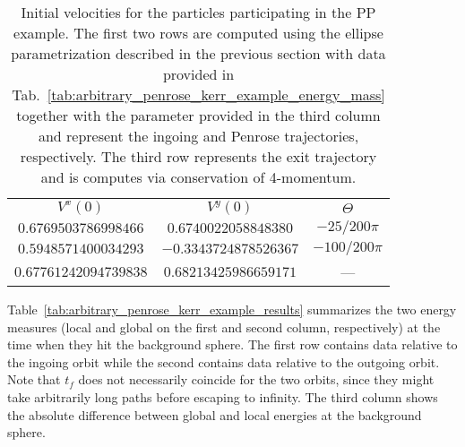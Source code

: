 \begin{table}[]
  \centering
  \begin{tabular}{ccc}
    \hline\hline
    $V^x(0)$              & $V^y(0)$              & $\Theta$       \\
    $0.6769503786998466$  & $0.6740022058848380$  & $-25/200 \pi$  \\
    $0.5948571400034293$  & $-0.3343724878526367$ & $-100/200 \pi$ \\
    $0.67761242094739838$ & $0.68213425986659171$ & ---            \\ \hline\hline
  \end{tabular}
  \caption{Initial velocities for the particles participating in the PP example. The first two rows are computed using the ellipse parametrization described in the previous section with data provided in Tab.~\ref{tab:arbitrary_penrose_kerr_example_energy_mass} together with the parameter provided in the third column and represent the ingoing and Penrose trajectories, respectively. The third row represents the exit trajectory and is computes via conservation of 4-momentum.}
  \label{tab:arbitrary_penrose_kerr_example_velocities}
\end{table}

Table~\ref{tab:arbitrary_penrose_kerr_example_results} summarizes the two energy measures (local and global on the first and second column, respectively) at the time when they hit the background sphere. The first row contains data relative to the ingoing orbit while the second contains data relative to the outgoing orbit. Note that $t_f$ does not necessarily coincide for the two orbits, since they might take arbitrarily long paths before escaping to infinity. The third column shows the absolute difference between global and local energies at the background sphere.

\begin{table}[]
  \centering
  \caption{Energy measures at the time of collision with the background sphere. The first and second row represent the ingoing and the outgoing orbits, respectively. The third column shows the absolute difference between energy measures at the background sphere radius. Note that $t_f$ is not necessarily the same for both trajectories.}
  \label{tab:arbitrary_penrose_kerr_example_results}
\end{table}

